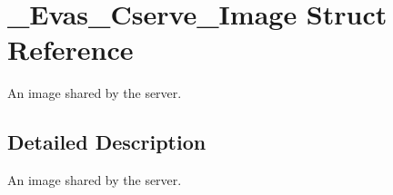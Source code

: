 \section{\_\-Evas\_\-Cserve\_\-Image Struct Reference}
\label{struct__Evas__Cserve__Image}


An image shared by the server.  




\subsection{Detailed Description}
An image shared by the server. 